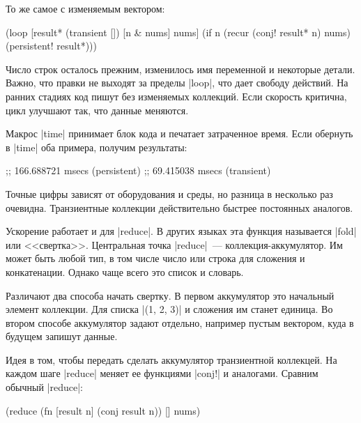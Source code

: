\noindent
То же самое с изменяемым вектором:

\begin{english}
  \begin{clojure}
(loop [result* (transient [])
       [n & nums] nums]
  (if n
    (recur (conj! result* n) nums)
    (persistent! result*)))
  \end{clojure}
\end{english}

Число строк осталось прежним, изменилось имя переменной и некоторые
детали. Важно, что правки не выходят за пределы \spverb|loop|, что дает свободу
действий. На ранних стадиях код пишут без изменяемых коллекций. Если скорость
критична, цикл улучшают так, что данные меняются.

Макрос \spverb|time| принимает блок кода и печатает затраченное время. Если
обернуть в \spverb|time| оба примера, получим результаты:

\begin{english}
  \begin{text}
;; 166.688721 msecs (persistent)
;;  69.415038 msecs (transient)
  \end{text}
\end{english}

Точные цифры зависят от оборудования и среды, но разница в несколько раз
очевидна. Транзиентные коллекции действительно быстрее постоянных аналогов.

Ускорение работает и для \spverb|reduce|. В других языках эта функция называется
\spverb|fold| или <<свертка>>. Центральная точка \spverb|reduce|~---
коллекция-аккумулятор. Им может быть любой тип, в том числе число или строка для
сложения и конкатенации. Однако чаще всего это список и словарь.

Различают два способа начать свертку. В первом аккумулятор это начальный
элемент коллекции. Для списка \spverb|(1, 2, 3)| и сложения им станет
единица. Во втором способе аккумулятор задают отдельно, например пустым вектором, куда в
будущем запишут данные.

Идея в том, чтобы передать сделать аккумулятор транзиентной коллекцей. На каждом
шаге \spverb|reduce| меняет ее функциями \spverb|conj!| и аналогами. Сравним
обычный \spverb|reduce|:

\begin{english}
  \begin{clojure}
(reduce
 (fn [result n]
   (conj result n))
 []
 nums)
  \end{clojure}
\end{english}


